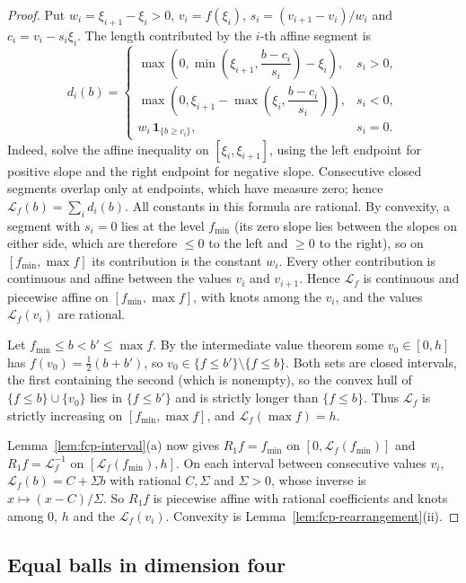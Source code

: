\begin{proof}
Put $w_i=\xi_{i+1}-\xi_i>0$, $v_i=f(\xi_i)$, $s_i=(v_{i+1}-v_i)/w_i$ and $c_i=v_i-s_i\xi_i$. The length contributed by the $i$-th affine segment is
\[
 d_i(b)=\begin{cases}
 \max\!\left(0,\min\!\left(\xi_{i+1},\dfrac{b-c_i}{s_i}\right)-\xi_i\right),&s_i>0,\\
 \max\!\left(0,\xi_{i+1}-\max\!\left(\xi_i,\dfrac{b-c_i}{s_i}\right)\right),&s_i<0,\\
 w_i\,\mathbf1_{\{b\ge c_i\}},&s_i=0.
 \end{cases}
\]
Indeed, solve the affine inequality on $[\xi_i,\xi_{i+1}]$, using the left endpoint for positive slope and the right
endpoint for negative slope. Consecutive closed segments overlap only at endpoints, which have measure zero; hence
$\mathcal L_f(b)=\sum_i d_i(b)$. All constants in this formula are rational. By convexity, a segment with $s_i=0$ lies at
the level $f_{\min}$ (its zero slope lies between the slopes on either side, which are therefore $\le0$ to the left and
$\ge0$ to the right), so on $[f_{\min},\max f]$ its contribution is the constant $w_i$. Every other contribution is
continuous and affine between the values $v_i$ and $v_{i+1}$. Hence $\mathcal L_f$ is continuous and piecewise affine
on $[f_{\min},\max f]$, with knots among the $v_i$, and the values $\mathcal L_f(v_i)$ are rational.

Let $f_{\min}\le b<b'\le\max f$. By the intermediate value theorem some $v_0\in[0,h]$ has $f(v_0)=\frac12(b+b')$, so
$v_0\in\{f\le b'\}\setminus\{f\le b\}$. Both sets are closed intervals, the first containing the second (which is
nonempty), so the convex hull of $\{f\le b\}\cup\{v_0\}$ lies in $\{f\le b'\}$ and is strictly longer than
$\{f\le b\}$. Thus $\mathcal L_f$ is strictly increasing on $[f_{\min},\max f]$, and $\mathcal L_f(\max f)=h$.

Lemma~\ref{lem:fcp-interval}(a) now gives $R_1f=f_{\min}$ on $[0,\mathcal L_f(f_{\min})]$ and $R_1f=\mathcal L_f^{-1}$ on
$[\mathcal L_f(f_{\min}),h]$. On each interval between consecutive values $v_i$, $\mathcal L_f(b)=C+\Sigma b$ with rational
$C,\Sigma$ and $\Sigma>0$, whose inverse is $x\mapsto(x-C)/\Sigma$. So $R_1f$ is piecewise affine with rational
coefficients and knots among $0$, $h$ and the $\mathcal L_f(v_i)$. Convexity is Lemma~\ref{lem:fcp-rearrangement}(ii).
\end{proof}

\subsection{Equal balls in dimension four}\label{sec:fcp-equal}

